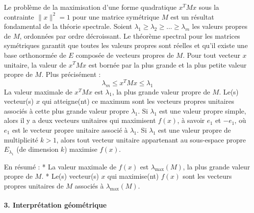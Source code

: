 \documentclass[11pt,a4paper]{report}
\begin{document}
Le problème de la maximisation d'une forme quadratique \(x^T M x\) sous
la contrainte \(\|x\|^2=1\) pour une matrice symétrique \(M\) est un
résultat fondamental de la théorie spectrale. Soient
\(\lambda_1 \ge \lambda_2 \ge \dots \ge \lambda_m\) les valeurs propres
de \(M\), ordonnées par ordre décroissant. Le théorème spectral pour les
matrices symétriques garantit que toutes les valeurs propres sont
réelles et qu'il existe une base orthonormée de \(E\) composée de
vecteurs propres de \(M\). Pour tout vecteur \(x\) unitaire, la valeur
de \(x^T M x\) est bornée par la plus grande et la plus petite valeur
propre de \(M\). Plus précisément :
\[ \lambda_m \le x^T M x \le \lambda_1 \] La valeur maximale de
\(x^T M x\) est \(\lambda_1\), la plus grande valeur propre de \(M\).
Le(s) vecteur(s) \(x\) qui atteigne(nt) ce maximum sont les vecteurs
propres unitaires associés à cette plus grande valeur propre
\(\lambda_1\). Si \(\lambda_1\) est une valeur propre simple, alors il y
a deux vecteurs unitaires qui maximisent \(f(x)\), à savoir \(e_1\) et
\(-e_1\), où \(e_1\) est le vecteur propre unitaire associé à
\(\lambda_1\). Si \(\lambda_1\) est une valeur propre de multiplicité
\(k > 1\), alors tout vecteur unitaire appartenant au sous-espace propre
\(E_{\lambda_1}\) (de dimension \(k\)) maximise \(f(x)\).

En résumé : * La valeur maximale de \(f(x)\) est \(\lambda_{\max}(M)\),
la plus grande valeur propre de \(M\). * Le(s) vecteur(s) \(x\) qui
maximise(nt) \(f(x)\) sont les vecteurs propres unitaires de \(M\)
associés à \(\lambda_{\max}(M)\).

\hypertarget{interpruxe9tation-guxe9omuxe9trique}{%
\paragraph{3. Interprétation
géométrique}\label{interpruxe9tation-guxe9omuxe9trique}}
\end{document}
